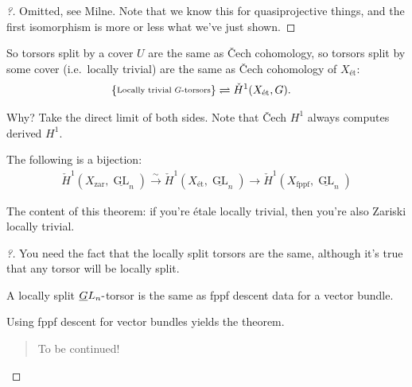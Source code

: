 \begin{proof}[?]

Omitted, see Milne. Note that we know this for quasiprojective things,
and the first isomorphism is more or less what we've just shown.

\end{proof}

\begin{corollary}

So torsors split by a cover \(U\) are the same as Čech cohomology, so
torsors split by some cover (i.e.~locally trivial) are the same as Čech
cohomology of \(X_\text{ét}\):
\begin{align*}  
\left\{{\substack{\text{Locally trivial $G{\hbox{-}}$torsors}}}\right\}
&\rightleftharpoons
{\check{H}}^1(X_\text{ét}, G)
.\end{align*}

\end{corollary}

Why? Take the direct limit of both sides. Note that Čech \(H^1\) always
computes derived \(H^1\).

\begin{theorem}\label{thm:hilb90}

The following is a bijection:
\begin{align*}  
{\check{H}}^1(X_{\mathrm{zar}}, \underline{\operatorname{GL}}_n)
\xrightarrow{\sim}
{\check{H}}^1(X_\text{ét}, \underline{\operatorname{GL}}_n)
\to
{\check{H}}^1(X_\mathrm{\operatorname{fppf}}, \underline{\operatorname{GL}}_n)
\end{align*}

\end{theorem}

\begin{remark}

The content of this theorem: if you're étale locally trivial, then
you're also Zariski locally trivial.

\end{remark}

\begin{proof}[?]

You need the fact that the locally split torsors are the same, although
it's true that any torsor will be locally split.

\begin{claim}

A locally split \(\underline{G}L_n{\hbox{-}}\)torsor is the same as fppf
descent data for a vector bundle.

\end{claim}

Using fppf descent for vector bundles yields the theorem.

\begin{quote}
To be continued!
\end{quote}

\end{proof}

